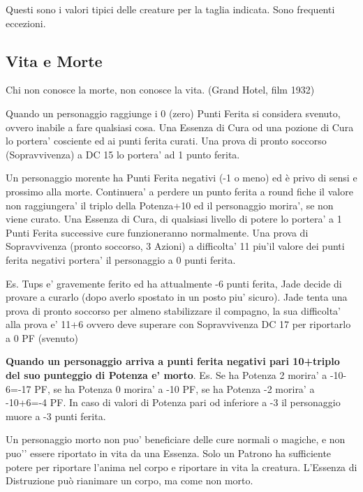 \documentclass[a4paper,11pt,twoside,openany]{book}
\begin{document}
\smallskip
Questi sono i valori tipici delle creature per la taglia indicata.
Sono frequenti eccezioni.
\bigskip

\pagebreak

\subsection{Vita e Morte}

\label{vita-e-morte}
\begin{tcolorbox}[enhanced,arc=5pt,boxrule=0.3pt]{Chi non conosce la morte, non conosce la vita. (Grand Hotel, film 1932)}\end{tcolorbox}\medskip

Quando un personaggio raggiunge i 0 (zero) Punti Ferita si considera svenuto, ovvero inabile a fare qualsiasi cosa. Una Essenza di Cura od una pozione di Cura lo portera’ cosciente ed ai punti ferita curati. Una prova di pronto soccorso (Sopravvivenza) a DC 15 lo portera’ ad 1 punto ferita.

Un personaggio morente ha Punti Ferita negativi (-1 o meno) ed è privo di sensi e prossimo alla morte. Continuera’ a perdere un punto ferita a round fiche il valore non raggiungera’ il triplo della Potenza+10 ed il personaggio morira’, se non viene curato.
Una Essenza di Cura, di qualsiasi livello di potere lo portera’ a 1 Punti Ferita successive cure funzioneranno normalmente.
Una prova di Sopravvivenza (pronto soccorso, 3 Azioni) a difficolta’ 11 piu’il valore dei punti ferita negativi portera’ il personaggio a 0 punti ferita.

Es. Tups e’ gravemente ferito ed ha attualmente -6 punti ferita, Jade decide di provare a curarlo (dopo averlo spostato in un posto piu’ sicuro). Jade tenta una prova di pronto soccorso per almeno stabilizzare il compagno, la sua difficolta’ alla prova e’ 11+6 ovvero deve superare con Sopravvivenza DC 17 per riportarlo a 0 PF (svenuto)

\textbf{Quando un personaggio arriva a punti ferita negativi pari 10+triplo del suo punteggio di Potenza e’ morto}. Es. Se ha Potenza 2 morira’ a -10-6=-17 PF, se ha Potenza 0 morira’ a -10 PF, se ha Potenza -2 morira’ a -10+6=-4 PF. In caso di valori di Potenza pari od inferiore a -3 il personaggio muore a -3 punti ferita.

\bigskip

Un personaggio morto non puo’ beneficiare delle cure normali o magiche, e non puo'’ essere riportato in vita da una Essenza. Solo un Patrono ha sufficiente potere per riportare l’anima nel corpo e riportare in vita la creatura. L’Essenza di Distruzione può rianimare un corpo, ma come non morto.
\end{document}
